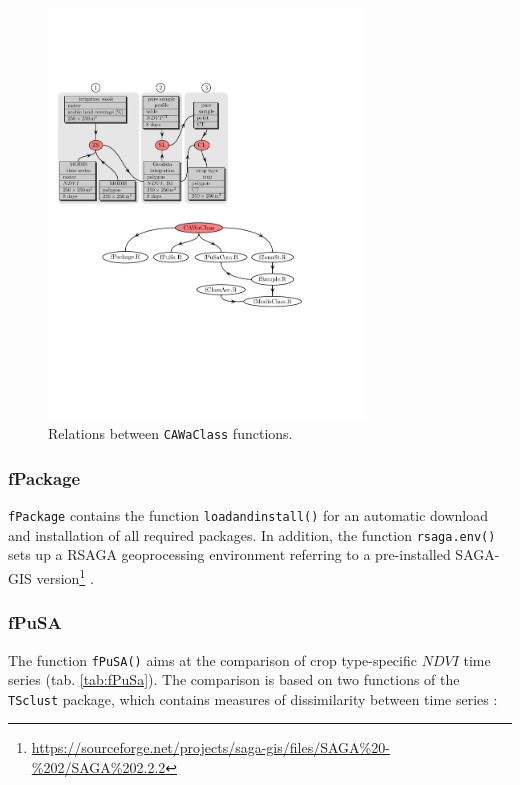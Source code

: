 \begin{figure}[t]
\centering\includegraphics[width=0.75\textwidth]{figures/CAWaClass_functions.pdf}
\caption{Relations between \texttt{CAWaClass} functions.}\label{fig:cawaclass-functions}
\end{figure}

\subsubsection{fPackage}\label{sec:fPackage}
\texttt{fPackage} contains the function \texttt{loadandinstall()} for an automatic  download and installation of all required packages. In addition, the function \texttt{rsaga.env()} sets up a RSAGA geoprocessing environment \citep{Brenning2008rsaga} referring to a pre-installed SAGA-GIS version\footnote{\url{https://sourceforge.net/projects/saga-gis/files/SAGA\%20-\%202/SAGA\%202.2.2}} \citep{Conrad-etal2015gmd}.

\subsubsection{fPuSA}\label{sec:fPuSA}
The function \texttt{fPuSA()} aims at the comparison of crop type-specific $NDVI$ time series (tab. \ref{tab:fPuSa}). The comparison is based on  two functions of the  \texttt{TSclust} package, which contains measures of dissimilarity between time series \citep{MonteroVilar2014jss}:

